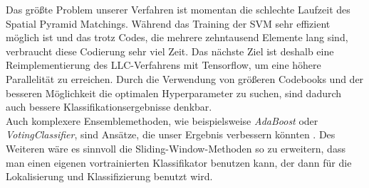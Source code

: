 Das größte Problem unserer Verfahren ist momentan die schlechte Laufzeit des Spatial Pyramid Matchings. Während das Training der SVM sehr effizient möglich ist und das trotz Codes, die mehrere zehntausend Elemente lang sind, verbraucht diese Codierung sehr viel Zeit. Das nächste Ziel ist deshalb eine Reimplementierung des LLC-Verfahrens mit Tensorflow, um eine höhere Parallelität zu erreichen. Durch die Verwendung von größeren Codebooks und der besseren Möglichkeit die optimalen Hyperparameter zu suchen, sind dadurch auch bessere Klassifikationsergebnisse denkbar. \\
Auch komplexere Ensemblemethoden, wie beispielsweise \emph{AdaBoost} oder \emph{VotingClassifier}, sind Ansätze, die unser Ergebnis verbessern könnten \cite{ywkjwh13}. Des Weiteren wäre es sinnvoll die Sliding-Window-Methoden so zu erweitern, dass man einen eigenen vortrainierten Klassifikator benutzen kann, der dann für die Lokalisierung und Klassifizierung benutzt wird.